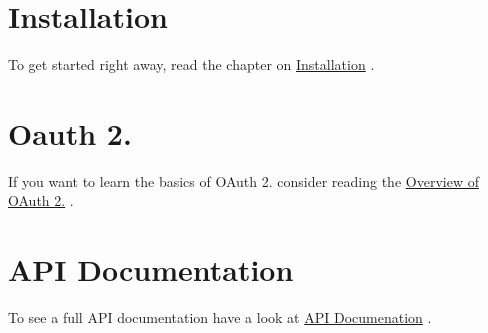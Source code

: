 \hypertarget{index_sec_1}{}\section{\-Installation}\label{index_sec_1}
\-To get started right away, read the chapter on \hyperlink{install}{\-Installation} .\hypertarget{index_sec_2}{}\section{\-Oauth 2.}\label{index_sec_2}
\-If you want to learn the basics of \-O\-Auth 2. consider reading the \hyperlink{oauth}{\-Overview of \-O\-Auth 2.} .\hypertarget{index_sec_3}{}\section{\-A\-P\-I Documentation}\label{index_sec_3}
\-To see a full \-A\-P\-I documentation have a look at \hyperlink{api}{\-A\-P\-I \-Documenation} . 